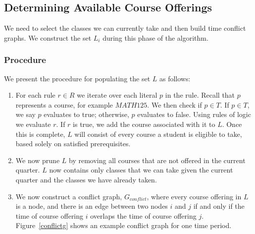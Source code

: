 \documentclass[11pt]{article} %
\begin{document}
\subsection{Determining Available Course Offerings} We need to select the
classes we can currently take and then build time conflict graphs.
We construct the set $L_i$ during this phase of the algorithm.

\subsubsection{Procedure} We present the procedure for populating the set $L$ as
follows: \begin{enumerate} \item For each rule $r \in R$ we iterate over each
literal $p$ in the rule.  Recall that $p$ represents a course, for example
$MATH125$.  We then check if $p \in T$.  If $p \in T$, we say $p$ evaluates
to true; otherwise, $p$ evaluates to false.  Using rules of logic we evaluate
$r$.  If $r$ is true, we add the course associated with it to $L$.  Once this
is complete, $L$ will consist of every course a student is eligible to take, based solely
on satisfied prerequisites.  \item We now prune $L$ by removing all
courses that are not offered in the current quarter.  $L$ now contains
only classes that we can take given the current quarter and the classes we have
already taken.  \item We now construct a conflict graph, $G_{conflict}$, where
every course offering in $L$ is a node, and there is an edge between two nodes
$i$ and $j$ if and only if the time of course offering $i$ overlaps the time of
course offering $j$.  Figure~\ref{conflictg} shows an example conflict graph for
one time period.  \end{enumerate}
\end{document}

